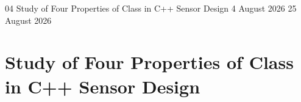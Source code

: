 \GenerateCoverPage
{04} %
{Study of Four Properties of Class in C++ Sensor Design} %
{4 August 2026} %
{25 August 2026} %

\noindent
\chapter{Study of Four Properties of Class in C++ Sensor Design}







\setcounter{section}{0}
